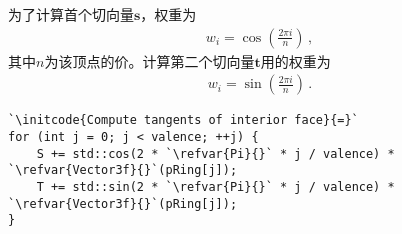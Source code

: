 为了计算首个切向量$\bm s$，权重为
\begin{align*}
    w_i=\cos{\left(\frac{2\pi i}{n}\right)}\, ,
\end{align*}
其中$n$为该顶点的价。计算第二个切向量$\bm t$用的权重为
\begin{align*}
    w_i=\sin{\left(\frac{2\pi i}{n}\right)}\, .
\end{align*}

\begin{lstlisting}
`\initcode{Compute tangents of interior face}{=}`
for (int j = 0; j < valence; ++j) {
    S += std::cos(2 * `\refvar{Pi}{}` * j / valence) * `\refvar{Vector3f}{}`(pRing[j]);
    T += std::sin(2 * `\refvar{Pi}{}` * j / valence) * `\refvar{Vector3f}{}`(pRing[j]);
}
\end{lstlisting}

